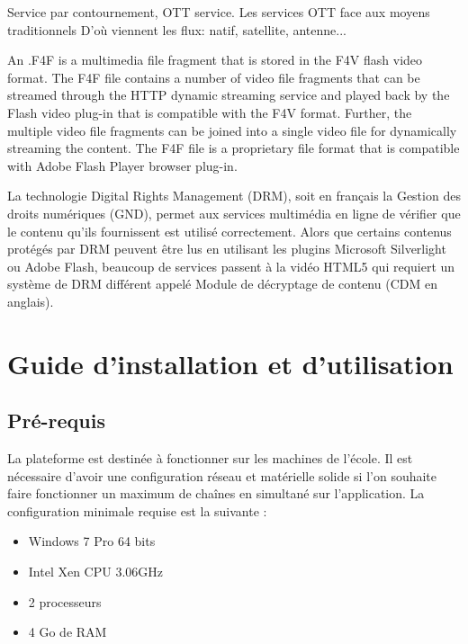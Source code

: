 \documentclass{polytech/polytech}
\begin{document}
Service par contournement, OTT service.
Les services OTT face aux moyens traditionnels 
D'où viennent les flux: natif, satellite, antenne...





An .F4F is a multimedia file fragment that is stored in the F4V flash video format. The F4F file contains a number of video file fragments that can be streamed through the HTTP dynamic streaming service and played back by the Flash video plug-in that is compatible with the F4V format. Further, the multiple video file fragments can be joined into a single video file for dynamically streaming the content. The F4F file is a proprietary file format that is compatible with Adobe Flash Player browser plug-in.



La technologie Digital Rights Management (DRM), soit en français la Gestion des droits numériques (GND), permet aux services multimédia en ligne de vérifier que le contenu qu'ils fournissent est utilisé correctement. Alors que certains contenus protégés par DRM peuvent être lus en utilisant les plugins Microsoft Silverlight ou Adobe Flash, beaucoup de services passent à la vidéo HTML5 qui requiert un système de DRM différent appelé Module de décryptage de contenu (CDM en anglais).



\chapter{Guide d'installation et d'utilisation}


\section{Pré-requis}


La plateforme est destinée à fonctionner sur les machines de l’école. Il est nécessaire d'avoir une configuration réseau et matérielle solide si l'on souhaite faire fonctionner un maximum de chaînes en simultané sur l'application. La configuration minimale requise est la suivante :

\begin{itemize}
	\item Windows 7 Pro 64 bits
	\item Intel Xen CPU 3.06GHz
	\item 2 processeurs
	\item 4 Go de RAM
\end{itemize}
\end{document}
